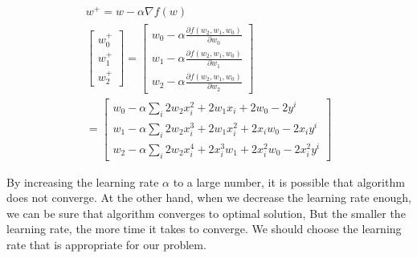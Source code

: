\documentclass[en]{university}
\begin{document}
\subsection{}
\begin{gather*}
    w^+ = w - \alpha \nabla f(w) \\
    \begin{bmatrix}
        w_0^+ \\
        w_1^+ \\
        w_2^+
    \end{bmatrix}
    = \begin{bmatrix}
        w_0 - \alpha \frac{\partial f(w_2, w_1, w_0)}{\partial w_0} \\
        w_1 - \alpha \frac{\partial f(w_2, w_1, w_0)}{\partial w_1} \\
        w_2 - \alpha \frac{\partial f(w_2, w_1, w_0)}{\partial w_2}
    \end{bmatrix} \\
    = \begin{bmatrix}
        w_0 - \alpha \sum_i 2 w_2 x_i^2 + 2 w_1 x_i + 2 w_0 - 2 y^i \\
        w_1 - \alpha \sum_i 2 w_2 x_i^3 + 2 w_1 x_i^2 + 2 x_i w_0 - 2 x_i y^i \\
        w_2 - \alpha \sum_i 2 w_2 x_i^4 + 2 x_i^3 w_1 + 2 x_i^2 w_0 - 2 x_i^2 y^i
    \end{bmatrix}
\end{gather*}

By increasing the learning rate $\alpha$ to a large number, it is possible that algorithm does not converge. At the other hand, when 
we decrease the learning rate enough, we can be sure that algorithm converges to optimal solution, But the smaller the learning rate,
the more time it takes to converge. We should choose the learning rate that is appropriate for our problem.
\end{document}
